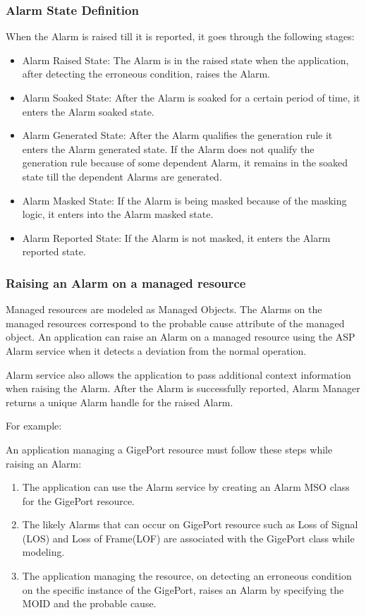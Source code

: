 \begin{flushleft}
\subsubsection{Alarm State Definition}
When the Alarm is raised till it is reported, it goes through the following stages:
\begin{itemize}
\item
Alarm Raised State: The Alarm is in the raised state when the application, after detecting the erroneous condition,
    raises the Alarm. 
\item
Alarm Soaked State: After the Alarm is soaked for a certain period of time, it
    enters the Alarm soaked state.
\item
Alarm Generated State: After the Alarm qualifies the generation rule it enters
    the Alarm generated state. If the Alarm does not qualify the generation rule     
    because of some dependent Alarm, it remains in the soaked state till the
    dependent Alarms are generated.
\item
Alarm Masked State: If the Alarm is being masked because of the masking
logic, it enters into the Alarm masked state.
\item
Alarm Reported State: If the Alarm is not masked, it enters the
    Alarm reported state.
\end{itemize}

\subsubsection{Raising an Alarm on a managed resource}
Managed resources are modeled as Managed Objects. The Alarms on the managed resources correspond to the probable cause attribute of the managed object.
An application can raise an Alarm on a managed resource using the ASP Alarm service when it detects a deviation from the normal operation. 
\par
Alarm service also allows the application to pass additional context information when raising the Alarm. After the Alarm is successfully reported, 
Alarm Manager returns a unique Alarm handle for the raised Alarm. 

For example: \par
An application managing a GigePort resource must follow these steps while raising an Alarm:
\begin{enumerate}
\item
The application can use the Alarm service by creating an Alarm MSO class for the GigePort resource.
\item
The likely Alarms that can occur on GigePort resource such as Loss of Signal (LOS) and Loss of Frame(LOF) are associated with the GigePort 
class while modeling. 
\item
The application managing the resource, on detecting an erroneous condition on the specific instance of the GigePort, raises an Alarm by 
specifying the MOID and the probable cause. 
\end{enumerate}


\end{flushleft}
